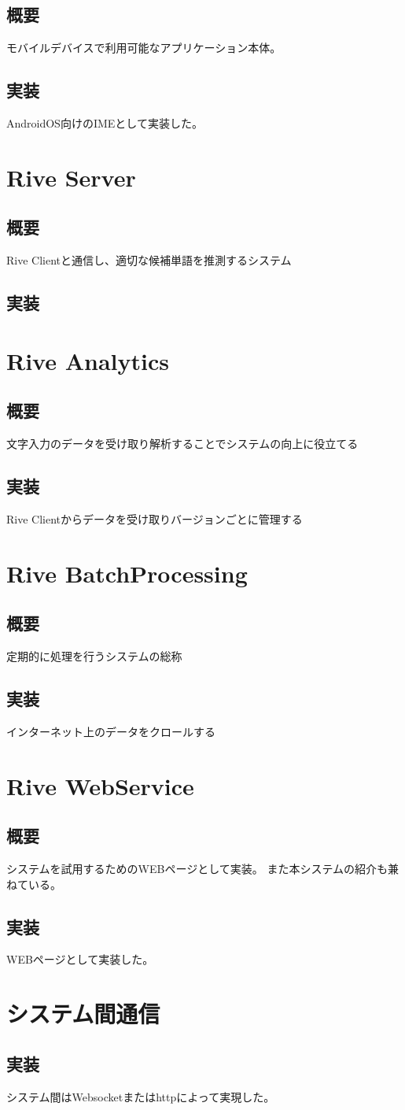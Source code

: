 \subsection{概要}
モバイルデバイスで利用可能なアプリケーション本体。
\subsection{実装}
AndroidOS向けのIMEとして実装した。

\section{Rive Server}
\subsection{概要}
Rive Clientと通信し、適切な候補単語を推測するシステム
\subsection{実装}


\section{Rive Analytics}
\subsection{概要}
文字入力のデータを受け取り解析することでシステムの向上に役立てる
\subsection{実装}
Rive Clientからデータを受け取りバージョンごとに管理する

\section{Rive BatchProcessing}
\subsection{概要}
定期的に処理を行うシステムの総称
\subsection{実装}
インターネット上のデータをクロールする

\section{Rive WebService}
\subsection{概要}
システムを試用するためのWEBページとして実装。
また本システムの紹介も兼ねている。
\subsection{実装}
WEBページとして実装した。

\section{システム間通信}
\subsection{実装}
システム間はWebsocketまたはhttpによって実現した。
